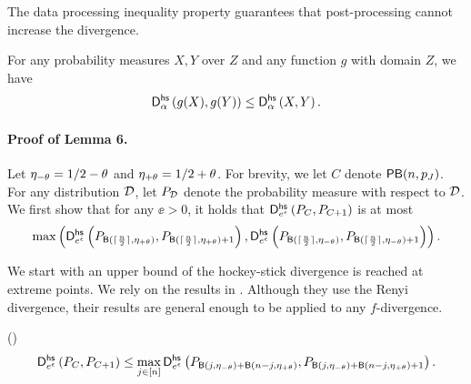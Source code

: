 The data processing inequality property guarantees that post-processing
cannot increase the divergence.
\begin{lemma} \label{lem:dpe}
For any probability measures $X, Y$ over $Z$ and any function $g$ with domain $Z$, we have 
\begin{equation*}
    \mathsf{D}^\mathsf{hs}_{\alpha}\left({g(X)}, {g(Y)}\right) \le \mathsf{D}^\mathsf{hs}_{\alpha}\left({X}, {Y}\right).
\end{equation*}
\end{lemma}
\fi

\paragraph{Proof of Lemma 6.}
Let ${\eta_{-\theta}} = 1/2 - \theta$ and ${\eta_{+\theta}} = 1/2 + \theta$. 
For brevity, we let $C$ denote $\mathsf{PB}(n,p_J)$. For any distribution
${\cal D}$, let $P_{\cal D}$ denote the probability measure with respect to
${\cal D}$.
We first show that for any $\ee>0$, it holds that  
$\mathsf{D}^\mathsf{hs}_{e^\epsilon}\left({P_{C}}, {P_{C + 1}}\right)$ is at most 
\begin{align*}
   \max\left(\mathsf{D}^\mathsf{hs}_{e^\epsilon}\left({P_{\mathsf{B}(\lceil\frac{n}{2}\rceil, {\eta_{+\theta}})}}, {P_{\mathsf{B}(\lceil\frac{n}{2}\rceil, {\eta_{+\theta}})+1}}\right),
    \mathsf{D}^\mathsf{hs}_{e^\epsilon}\left({P_{\mathsf{B}(\lceil\frac{n}{2}\rceil, \eta_{-\theta})}}, {P_{\mathsf{B}(\lceil\frac{n}{2}\rceil, \eta_{-\theta})+1}}\right) \right).
\end{align*}


We start with an upper bound of the hockey-stick divergence is reached at
extreme points. We rely on the results in \cite{COK22}. Although they use the
Renyi divergence, their results are general enough to be applied to any $f$-divergence.

\begin{lemma} (\cite[Lemma 3.5]{COK22})
\begin{align}
     \mathsf{D}^\mathsf{hs}_{e^\epsilon}\left({P_{C}}, {P_{C + 1}}\right)
     \leq  \max_{j \in [n]} \mathsf{D}^\mathsf{hs}_{e^\epsilon}\left({P_{\mathsf{B}(j, \eta_{-\theta}) + \mathsf{B}(n-j,\eta_{+\theta})}}, {P_{\mathsf{B}(j, \eta_{-\theta}) + \mathsf{B}(n-j,\eta_{+\theta})+1}}\right).\label{eqa:twobinom}
\end{align}
\end{lemma}

